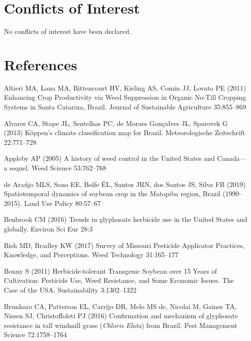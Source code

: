 \documentclass[
  12pt,
  a4paper]{article}
\begin{document}
\hypertarget{conflicts-of-interest}{%
\section{Conflicts of Interest}\label{conflicts-of-interest}}

No conflicts of interest have been declared.

\hypertarget{references}{%
\section{References}\label{references}}

\hypertarget{refs}{}
\leavevmode\hypertarget{ref-altieri_enhancing_2011}{}%
Altieri MA, Lana MA, Bittencourt HV, Kieling AS, Comin JJ, Lovato PE
(2011) Enhancing Crop Productivity via Weed Suppression in Organic
No-Till Cropping Systems in Santa Catarina, Brazil. Journal of
Sustainable Agriculture 35:855--869

\leavevmode\hypertarget{ref-alvares_koppens_2013}{}%
Alvares CA, Stape JL, Sentelhas PC, de Moraes Gonçalves JL, Sparovek G
(2013) Köppen's climate classification map for Brazil. Meteorologische
Zeitschrift 22:771--728

\leavevmode\hypertarget{ref-appleby_history_2005}{}%
Appleby AP (2005) A history of weed control in the United States and
Canada---a sequel. Weed Science 53:762--768

\leavevmode\hypertarget{ref-araujo_spatiotemporal_2019}{}%
de Araújo MLS, Sano EE, Bolfe ÉL, Santos JRN, dos Santos JS, Silva FB
(2019) Spatiotemporal dynamics of soybean crop in the Matopiba region,
Brazil (1990--2015). Land Use Policy 80:57--67

\leavevmode\hypertarget{ref-benbrook_trends_2016}{}%
Benbrook CM (2016) Trends in glyphosate herbicide use in the United
States and globally. Environ Sci Eur 28:3

\leavevmode\hypertarget{ref-bish_survey_2017}{}%
Bish MD, Bradley KW (2017) Survey of Missouri Pesticide Applicator
Practices, Knowledge, and Perceptions. Weed Technology 31:165--177

\leavevmode\hypertarget{ref-bonny_herbicide-tolerant_2011}{}%
Bonny S (2011) Herbicide-tolerant Transgenic Soybean over 15 Years of
Cultivation: Pesticide Use, Weed Resistance, and Some Economic Issues.
The Case of the USA. Sustainability 3:1302--1322

\leavevmode\hypertarget{ref-brunharo_confirmation_2016}{}%
Brunharo CA, Patterson EL, Carrijo DR, Melo MS de, Nicolai M, Gaines TA,
Nissen SJ, Christoffoleti PJ (2016) Confirmation and mechanism of
glyphosate resistance in tall windmill grass (\emph{Chloris}
\emph{Elata}) from Brazil. Pest Management Science 72:1758--1764
\end{document}
